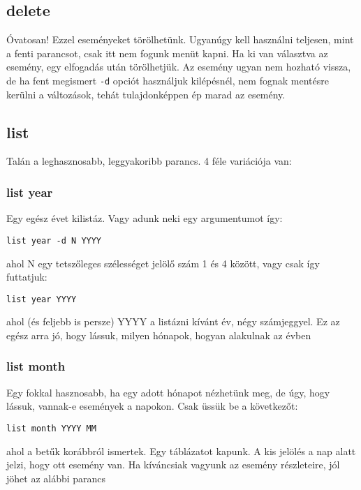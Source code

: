 \documentclass[a4paper]{article}
\begin{document}
\subsection{delete}

Óvatosan! Ezzel eseményeket törölhetünk. Ugyanúgy kell használni teljesen, mint a fenti parancsot, csak itt nem fogunk menüt kapni. Ha ki van választva az esemény, egy elfogadás után törölhetjük. Az esemény ugyan nem hozható vissza, de ha fent megismert \texttt{-d} opciót használjuk kilépésnél, nem fognak mentésre kerülni a változások, tehát tulajdonképpen ép marad az esemény.

\subsection{list}

Talán a leghasznosabb, leggyakoribb parancs. 4 féle variációja van:

\subsubsection{list year}

Egy egész évet kilistáz. Vagy adunk neki egy argumentumot így:
\begin{center}
	\texttt{list year -d N YYYY}
\end{center} 
ahol N egy tetszőleges szélességet jelölő szám 1 és 4 között, vagy csak így futtatjuk:
\begin{center}
	\texttt{list year YYYY}
\end{center}
ahol (és feljebb is persze) YYYY a listázni kívánt év, négy számjeggyel. Ez az egész arra jó, hogy lássuk, milyen hónapok, hogyan alakulnak az évben

\subsubsection{list month}

Egy fokkal hasznosabb, ha egy adott hónapot nézhetünk meg, de úgy, hogy lássuk, vannak-e események a napokon. Csak üssük be a következőt:

\begin{center}
	\texttt{list month YYYY MM}
\end{center}

ahol a betűk korábbról ismertek. Egy táblázatot kapunk. A kis jelölés a nap alatt jelzi, hogy ott esemény van. Ha kíváncsiak vagyunk az esemény részleteire, jól jöhet az alábbi parancs
\end{document}
